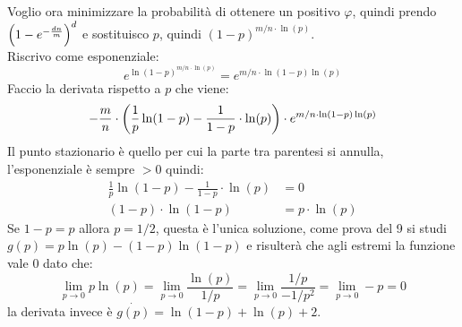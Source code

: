 Voglio ora minimizzare la probabilità di ottenere un positivo $\varphi$, quindi prendo $\left(1 - e^{-\frac{dn}{m}}\right)^d$ e sostituisco $p$, quindi $(1 - p)^{m/n \cdot \ln(p)}$.\\
Riscrivo come esponenziale:
\begin{equation*}
    e^{\ln(1 - p)^{m/n \cdot \ln(p)}} = e^{m/n \cdot \ln(1 - p)\ln(p)}
\end{equation*}
Faccio la derivata rispetto a $p$ che viene:
\begin{equation*}
    -\frac{m}{n} \cdot \left(\frac{1}{p}\ln(1 - p) - \frac{1}{1 - p} \cdot \ln(p)\right) \cdot e^{m/n \cdot \ln(1 - p)\ln(p)}
\end{equation*}
Il punto stazionario è quello per cui la parte tra parentesi si annulla, l'esponenziale è sempre $> 0$ quindi:
\begin{align*}
    \frac{1}{p}\ln(1 - p) - \frac{1}{1 - p} \cdot \ln(p) &= 0\\
    (1 - p) \cdot \ln(1 - p) &= p \cdot \ln(p)
\end{align*}
Se $1 - p = p$ allora $p = 1/2$, questa è l'unica soluzione, come prova del 9 si studi $g(p) = p\ln(p) - (1 - p)\ln(1 - p)$ e risulterà che agli estremi la funzione vale 0 dato che:
\begin{equation*}
    \lim_{p \to 0}p \ln(p) = \lim_{p \to 0} \frac{\ln(p)}{1/p} = \lim_{p \to 0} \frac{1/p}{-1/p^2} = \lim_{p \to 0} -p = 0
\end{equation*}
la derivata invece è $\dot{g(p)} = \ln(1 - p) + \ln(p) + 2$.

